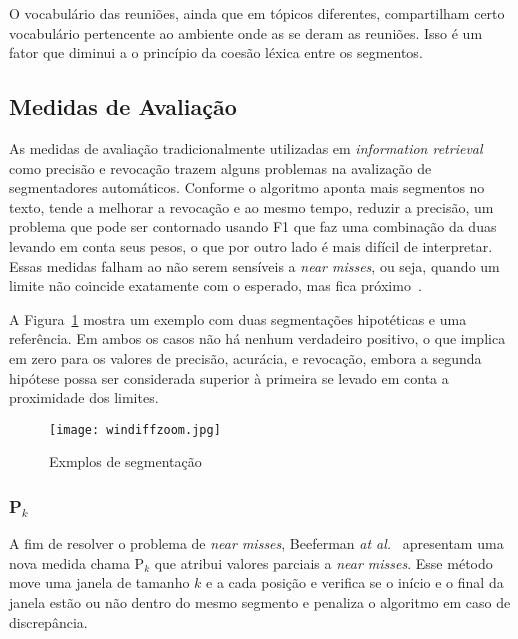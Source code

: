 O vocabulário das reuniões, ainda que em tópicos diferentes, compartilham certo vocabulário pertencente ao ambiente onde as se deram as reuniões. Isso é um fator que diminui a o princípio da coesão léxica entre os segmentos.


\subsection{Medidas de Avaliação}


	As medidas de avaliação tradicionalmente utilizadas em \textit{information retrieval} como precisão e revocação trazem alguns problemas na avalização de segmentadores automáticos.  
Conforme o algoritmo aponta mais segmentos no texto, tende a melhorar a revocação e ao mesmo tempo, reduzir a precisão, um problema que pode ser contornado usando F1 que faz uma combinação da duas levando em conta seus pesos, o que por outro lado é mais difícil de interpretar. 
Essas medidas falham ao não serem sensíveis a \textit{near misses}, ou seja, quando um limite não coincide exatamente com o esperado, mas fica próximo~\cite{Kern2009167}.

A Figura~\ref{fig:exemplosegmentacaozoom} mostra um exemplo com duas segmentações hipotéticas e uma referência. Em ambos os casos não há nenhum verdadeiro positivo, o que implica em zero para os valores de precisão, acurácia, e revocação, embora a segunda hipótese possa ser considerada superior à primeira se levado em conta a proximidade dos limites.



  \begin{figure}[!h]

	\centering
	\texttt{[image: windiffzoom.jpg]}
	\caption{Exmplos de segmentação}
	\label{fig:exemplosegmentacaozoom}

  \end{figure}



\subsubsection{P$_k$}
A fim de resolver o problema de \textit{near misses}, Beeferman \textit{at al.}~\cite{Beeferman1999} apresentam uma nova medida chama P$_k$ que atribui valores parciais a \textit{near misses}. Esse método move uma janela de tamanho $k$ e a cada posição e verifica se o início e o final da janela estão ou não dentro do mesmo segmento e penaliza o algoritmo em caso de discrepância. 

